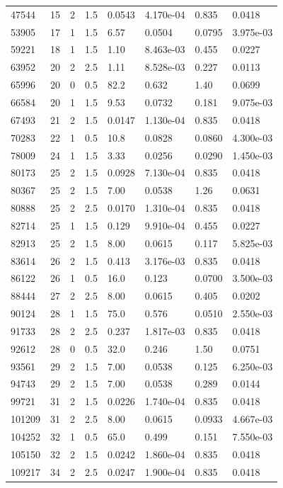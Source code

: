 \documentclass[preview]{standalone}
\begin{document}
{{\begin{tabular}{L{1.2cm}C{1.2cm} C{0.3cm}C{0.5cm} C{1.4cm}C{1.4cm} C{1.4cm}C{1.4cm}}
  47544  &    15  & 2     & 1.5 &  0.0543  & 4.170e-04  & 0.835 &  0.0418   \\ 
  53905  &    17  & 1     & 1.5 &  6.57  & 0.0504  & 0.0795 &  3.975e-03   \\ 
  59221  &    18  & 1     & 1.5 &  1.10  & 8.463e-03  & 0.455 &  0.0227   \\ 
  63952  &    20  & 2     & 2.5 &  1.11  & 8.528e-03  & 0.227 &  0.0113   \\ 
  65996  &    20  & 0     & 0.5 &  82.2  & 0.632  & 1.40 &  0.0699   \\ 
  66584  &    20  & 1     & 1.5 &  9.53  & 0.0732  & 0.181 &  9.075e-03   \\ 
  67493  &    21  & 2     & 1.5 &  0.0147  & 1.130e-04  & 0.835 &  0.0418   \\ 
  70283  &    22  & 1     & 0.5 &  10.8  & 0.0828  & 0.0860 &  4.300e-03   \\ 
  78009  &    24  & 1     & 1.5 &  3.33  & 0.0256  & 0.0290 &  1.450e-03   \\ 
  80173  &    25  & 2     & 1.5 &  0.0928  & 7.130e-04  & 0.835 &  0.0418   \\ 
  80367  &    25  & 2     & 1.5 &  7.00  & 0.0538  & 1.26 &  0.0631   \\ 
  80888  &    25  & 2     & 2.5 &  0.0170  & 1.310e-04  & 0.835 &  0.0418   \\ 
  82714  &    25  & 1     & 1.5 &  0.129  & 9.910e-04  & 0.455 &  0.0227   \\ 
  82913  &    25  & 2     & 1.5 &  8.00  & 0.0615  & 0.117 &  5.825e-03   \\ 
  83614  &    26  & 2     & 1.5 &  0.413  & 3.176e-03  & 0.835 &  0.0418   \\ 
  86122  &    26  & 1     & 0.5 &  16.0  & 0.123  & 0.0700 &  3.500e-03   \\ 
  88444  &    27  & 2     & 2.5 &  8.00  & 0.0615  & 0.405 &  0.0202   \\ 
  90124  &    28  & 1     & 1.5 &  75.0  & 0.576  & 0.0510 &  2.550e-03   \\ 
  91733  &    28  & 2     & 2.5 &  0.237  & 1.817e-03  & 0.835 &  0.0418   \\ 
  92612  &    28  & 0     & 0.5 &  32.0  & 0.246  & 1.50 &  0.0751   \\ 
  93561  &    29  & 2     & 1.5 &  7.00  & 0.0538  & 0.125 &  6.250e-03   \\ 
  94743  &    29  & 2     & 1.5 &  7.00  & 0.0538  & 0.289 &  0.0144   \\ 
  99721  &    31  & 2     & 1.5 &  0.0226  & 1.740e-04  & 0.835 &  0.0418   \\ 
  101209  &    31  & 2     & 2.5 &  8.00  & 0.0615  & 0.0933 &  4.667e-03   \\ 
  104252  &    32  & 1     & 0.5 &  65.0  & 0.499  & 0.151 &  7.550e-03   \\ 
  105150  &    32  & 2     & 1.5 &  0.0242  & 1.860e-04  & 0.835 &  0.0418   \\ 
  109217  &    34  & 2     & 2.5 &  0.0247  & 1.900e-04  & 0.835 &  0.0418   \\ 
\hline 
\end{tabular} 

}}
\end{document}
